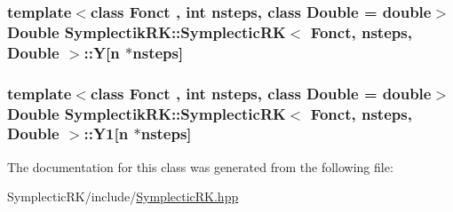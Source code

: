 \hypertarget{classSymplectikRK_1_1SymplecticRK_a5dded379f5dd0566c614a7f518f96535}{
\subsubsection[{Y}]{\setlength{\rightskip}{0pt plus 5cm}template$<$class Fonct , int nsteps, class Double  = double$>$ Double {\bf Symplectik\-R\-K\-::\-Symplectic\-R\-K}$<$ Fonct, nsteps, Double $>$\-::Y\mbox{[}{\bf n} $\ast$nsteps\mbox{]}\hspace{0.3cm}{\ttfamily [private]}}}\label{classSymplectikRK_1_1SymplecticRK_a5dded379f5dd0566c614a7f518f96535}
\hypertarget{classSymplectikRK_1_1SymplecticRK_ac7a77d482f7b748b3ad54b4bae384287}{
\subsubsection[{Y1}]{\setlength{\rightskip}{0pt plus 5cm}template$<$class Fonct , int nsteps, class Double  = double$>$ Double {\bf Symplectik\-R\-K\-::\-Symplectic\-R\-K}$<$ Fonct, nsteps, Double $>$\-::Y1\mbox{[}{\bf n} $\ast$nsteps\mbox{]}\hspace{0.3cm}{\ttfamily [private]}}}\label{classSymplectikRK_1_1SymplecticRK_ac7a77d482f7b748b3ad54b4bae384287}


The documentation for this class was generated from the following file\-:\begin{DoxyCompactItemize}
\item 
Symplectic\-R\-K/include/\hyperlink{SymplecticRK_8hpp}{Symplectic\-R\-K.\-hpp}\end{DoxyCompactItemize}
